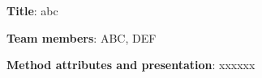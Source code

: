 \documentclass{article}
\begin{document}


\textbf{Title}: abc

\noindent \textbf{Team members}: ABC, DEF

\textbf{Method attributes and presentation}: xxxxxx
\end{document}
